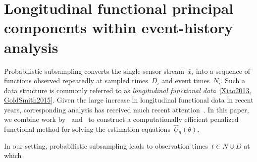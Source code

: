 \documentclass[11pt]{amsart}
\begin{document}
\section{Longitudinal functional principal components within
  event-history analysis}

Probabilistic subsampling converts the single sensor stream~$\bar x_i$
into a sequence of functions observed repeatedly at sampled
times~$D_i$ and event times~$N_i$. Such a data structure is commonly
referred to as \emph{longitudinal functional data}~\ref{Xiao2013,
  GoldSmith2015}.
Given the large increase in longitudinal functional data in recent
years, corresponding analysis has received much recent
attention~\citep{Morris2003, MorrisCarroll2006,
  Baladandayuthapani2008, Di2009, Greven2010, Staicu2010,
  ChenMuller2012, LiGuan2014}.
In this paper, we combine work by~\cite{Park2018}
and~\cite{Goldsmith2011} to construct a computationally efficient
penalized functional method for solving the estimation equations~$\hat
U_n (\theta)$.

In our setting, probabilistic subsampling leads to observation
times~$t \in N \cup D$ at which 
\end{document}

